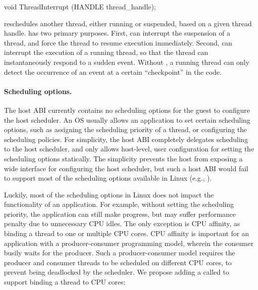 \begin{paldef}
void ThreadInterrupt (HANDLE thread_handle);
\end{paldef}



 reschedules another thread, either running or suspended, based on a given thread handle.
 has two primary purposes.
First,  can interrupt the suspension of a thread, and force the thread to resume execution immediately.
Second,  can interrupt the execution of a running thread,
so that the thread can instantaneously respond to a sudden event.
Without ,
a running thread can only detect the occurrence of an event at a certain ``checkpoint'' in the code.





\paragraph{Scheduling options.}
The host ABI currently contains no scheduling options for the guest to configure the host scheduler.
An OS usually allows an application to set certain scheduling options,
such as assigning the scheduling priority of a thread, or configuring the scheduling policies.
For simplicity,
the host ABI completely delegates scheduling to the host scheduler,
and only allows host-level, user configuration for setting the scheduling options statically.
The simplicity prevents the host from exposing a wide interface
for configuring the host scheduler,
but such a host ABI would fail to support
most of the scheduling options available in Linux (e.g., ).



Luckily, most of the scheduling options in Linux does not impact
the functionality of an application.
For example, without setting the scheduling priority,
the application can still make progress,
but may suffer performance penalty due to unnecessary CPU idles.
The only exception is CPU affinity, as binding a thread to one or multiple CPU cores.
CPU affinity is important
for an application with a producer-consumer programming model,
wherein the consumer busily waits for the producer.
Such a producer-consumer model requires the producer and consumer threads to be scheduled on different CPU cores, to prevent being deadlocked by the scheduler.
We propose adding a \hostapi{} called 
to support binding a thread to CPU cores:

